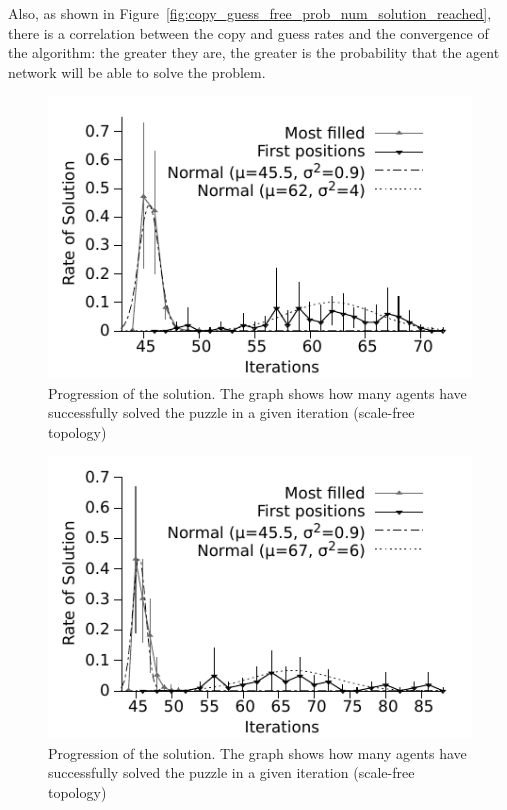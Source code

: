 \documentclass{article}
\begin{document}
Also, as shown in Figure~\ref{fig:copy_guess_free_prob_num_solution_reached}, there is a correlation between the copy and guess rates and the convergence of the algorithm: the greater they are, the greater is the probability that the agent network will be able to solve the problem.

\begin{figure}
\includegraphics[scale=1]{ijcai_sudoku/ring}
\caption{Progression of the solution. The graph shows how many agents have successfully solved the puzzle in a given iteration (scale-free topology)}
\label{fig:ring_gauss}
\end{figure}

\begin{figure}
\includegraphics[scale=1]{ijcai_sudoku/sf}
\caption{Progression of the solution. The graph shows how many agents have successfully solved the puzzle in a given iteration (scale-free topology)}
\label{fig:sf_gauss}
\end{figure}
\end{document}
